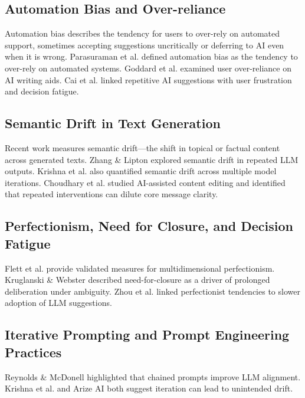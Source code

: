 \documentclass[conference]{IEEEtran} %
\begin{document}
\subsection{Automation Bias and Over-reliance}
Automation bias describes the tendency for users to over-rely on automated support, sometimes accepting suggestions uncritically or deferring to AI even when it is wrong. Parasuraman et al. \cite{parasuraman2000} defined automation bias as the tendency to over-rely on automated systems. Goddard et al. \cite{wei2025} examined user over-reliance on AI writing aids. Cai et al. \cite{choudhary2024} linked repetitive AI suggestions with user frustration and decision fatigue.

\subsection{Semantic Drift in Text Generation}
Recent work measures semantic drift—the shift in topical or factual content across generated texts. Zhang \& Lipton \cite{zhang2023} explored semantic drift in repeated LLM outputs. Krishna et al. \cite{krishna2024} also quantified semantic drift across multiple model iterations. Choudhary et al. \cite{choudhary2024} studied AI-assisted content editing and identified that repeated interventions can dilute core message clarity.

\subsection{Perfectionism, Need for Closure, and Decision Fatigue}
Flett et al. \cite{flett2002} provide validated measures for multidimensional perfectionism. Kruglanski \& Webster \cite{kruglanski1996} described need-for-closure as a driver of prolonged deliberation under ambiguity. Zhou et al. \cite{zhou2023} linked perfectionist tendencies to slower adoption of LLM suggestions.

\subsection{Iterative Prompting and Prompt Engineering Practices}
Reynolds \& McDonell \cite{reynolds2021} highlighted that chained prompts improve LLM alignment. Krishna et al. \cite{krishna2024} and Arize AI \cite{arize2025} both suggest iteration can lead to unintended drift.
\end{document}
